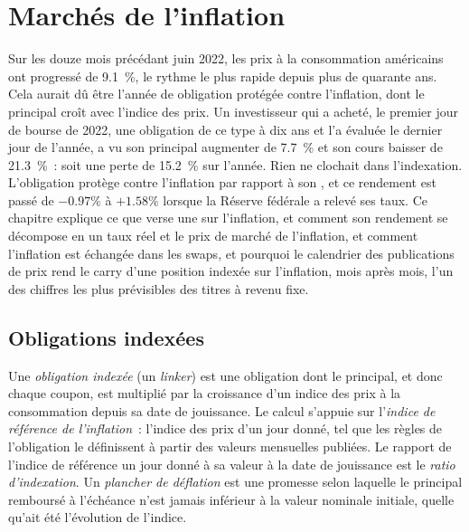 \chapter{Marchés de l'inflation}\label{ch:m2:inflation-markets}

Sur les douze mois précédant juin 2022, les prix à la consommation américains ont progressé de 9.1~\%, le
rythme le plus rapide depuis plus de quarante ans. Cela aurait dû être l'année de
obligation protégée contre l'inflation, dont le principal croît avec l'indice des prix. Un
investisseur qui a acheté, le premier jour de bourse de 2022, une obligation de ce type à dix ans
et l'a évaluée le dernier jour de l'année, a vu son principal augmenter de 7.7~\% et son cours baisser de 21.3~\%~:
soit une perte de 15.2~\% sur l'année. Rien ne clochait dans l'indexation. L'obligation
protège contre l'inflation par rapport à son \emph{}, et ce rendement
est passé de $-0.97\%$ à $+1.58\%$ lorsque la Réserve fédérale a relevé ses taux. Ce
chapitre explique ce que verse une  sur l'inflation, et comment son rendement se
décompose en un taux réel et le prix de marché de l'inflation, et comment l'inflation
est échangée dans les swaps, et pourquoi le calendrier des publications de prix rend le
carry d'une position indexée sur l'inflation, mois après mois, l'un des chiffres les plus prévisibles
des titres à revenu fixe.

\section{Obligations indexées}

\begin{definition}\label{def:m2:inflation-markets:linker}
Une \emph{obligation indexée} (un \emph{linker}) est une obligation
dont le principal, et donc chaque coupon, est multiplié par la croissance d'un indice des prix
à la consommation depuis sa date de jouissance. Le calcul s'appuie sur
l'\emph{indice de référence de l'inflation}~: l'indice des prix d'un jour donné,
tel que les règles de l'obligation le définissent à partir des valeurs mensuelles publiées. Le rapport
de l'indice de référence un jour donné à sa valeur à la date de jouissance est le
\emph{ratio d'indexation}. Un \emph{plancher de déflation} est une
promesse selon laquelle le principal remboursé à l'échéance n'est jamais inférieur à la
valeur nominale initiale, quelle qu'ait été l'évolution de l'indice.
\end{definition}

